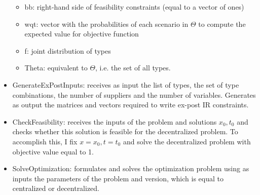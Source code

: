\documentclass[11pt, oneside]{article}
\begin{document}
\begin{itemize}
\begin{itemize}
        \item bb: right-hand side of feasibility constraints (equal to a vector of ones)
        \item wqt: vector with the probabilities of each scenario in \(\Theta\) to compute the expected value for objective function
        \item f: joint distribution of types
        \item Theta: equivalent to \(\Theta\), i.e. the set of all types.
    \end{itemize}
    \item GenerateExPostInputs: receives as input the list of types, the set of type combinations, the number of suppliers and the number of variables. Generates as output the matrices and vectors required
    to write ex-post IR constraints.
    \item CheckFeasibility: receives the inputs of the problem and solutions
    \(x_0, t_0\) and checks whether this solution is feasible for the decentralized problem. To accomplish this, I fix \(x=x_0, t=t_0\) and solve the decentralized problem with objective value equal to 1.
    \item SolveOptimization: formulates and solves the optimization problem using as inputs the parameters of the problem and version, which is equal to centralized or decentralized.
\end{itemize}
\end{document}
